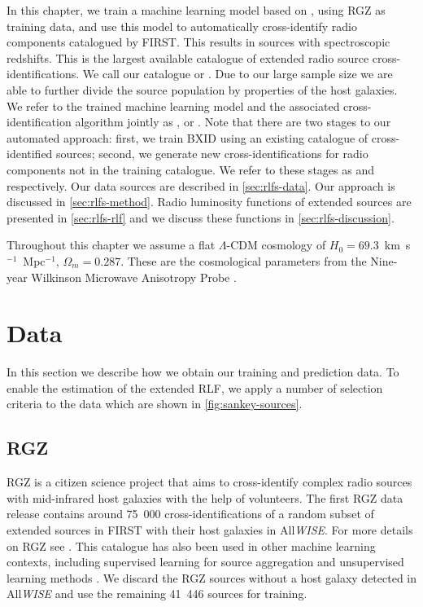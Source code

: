 In this chapter, we train a machine learning model based on \citet{alger18radio}, using RGZ as training data, and
use this model to automatically cross-identify \ncomponents{} radio components catalogued by FIRST. This results in \nsourceszsp{} sources
with spectroscopic redshifts. This is the largest available catalogue of
extended radio source cross-identifications. We call our catalogue
 or . Due to our large sample size we are able to further divide the
source population by properties of the host galaxies. We refer to the trained machine learning model and the associated cross-identification algorithm jointly as , or . Note that there are two stages to our automated approach: first, we train BXID using an existing catalogue of cross-identified sources; second, we generate new cross-identifications for radio components not in the training catalogue. We refer to these stages as  and  respectively. Our data sources are described in \autoref{sec:rlfs-data}. Our approach is discussed in \autoref{sec:rlfs-method}. Radio luminosity functions of extended sources are presented in \autoref{sec:rlfs-rlf} and we discuss these functions in \autoref{sec:rlfs-discussion}.

Throughout this chapter we assume a flat $\Lambda$-CDM cosmology of \linebreak $H_0 =
69.3$~km~s$^{-1}$~Mpc$^{-1}$, $\Omega_m = 0.287$. These are the cosmological
parameters from the Nine-year Wilkinson Microwave Anisotropy Probe
\citep[WMAP9;][]{hinshaw13wmap9}.

\section{Data} \label{sec:rlfs-data}

In this section we describe how we obtain our training and prediction data. To enable the estimation of the extended RLF, we apply a number of selection criteria to the data which are shown in \autoref{fig:sankey-sources}.

    \subsection{RGZ} \label{sec:rlfs-rgz-data}

    RGZ is a citizen science project that aims to cross-identify complex radio sources with mid-infrared host galaxies with the help of volunteers. The first RGZ data release contains around 75~000 cross-identifications of a random subset of extended sources in FIRST with their host galaxies in All\emph{WISE}. For more details on RGZ see \citet{banfield15}. This catalogue has also been used in other machine learning contexts, including supervised learning for source aggregation \citep{wu19claran} and unsupervised learning methods \citep{galvin19som,ralph19ae}. We discard the RGZ sources without a host galaxy detected in All\emph{WISE} and use the remaining 41~446 sources for training.

